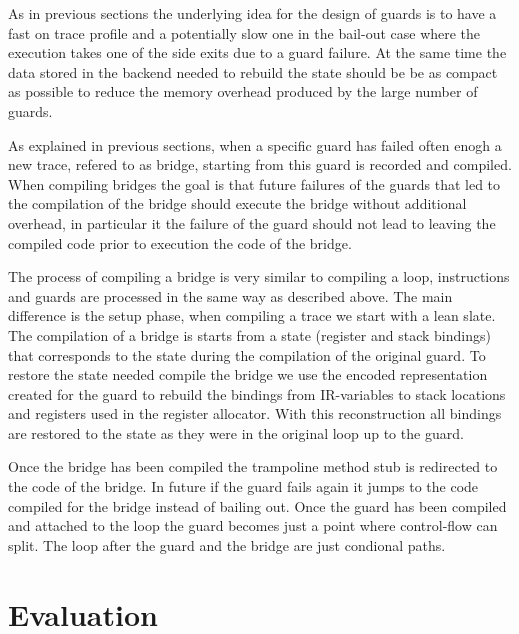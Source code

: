 \documentclass[10pt]{sigplanconf}
\newcommand\bivab[1]{\nb{DAVID}{#1}}
\begin{document}
As in previous sections the underlying idea for the design of guards is to have
a fast on trace profile and a potentially slow one in the bail-out case where
the execution takes one of the side exits due to a guard failure. At the same
time the data stored in the backend needed to rebuild the state should be be
as compact as possible to reduce the memory overhead produced by the large
number of guards\bivab{back this}.

As explained in previous sections, when a specific guard has failed often enogh
a new trace, refered to as bridge, starting from this guard is recorded and
compiled. When compiling bridges the goal is that future failures of the guards
that led to the compilation of the bridge should execute the bridge without
additional overhead, in particular it the failure of the guard should not lead
to leaving the compiled code prior to execution the code of the bridge.

The process of compiling a bridge is very similar to compiling a loop,
instructions and guards are processed in the same way as described above. The
main difference is the setup phase, when compiling a trace we start with a lean
slate. The compilation of a bridge is starts from a state (register and stack
bindings) that corresponds to the state during the compilation of the original
guard. To restore the state needed compile the bridge we use the encoded
representation created for the guard to rebuild the bindings from IR-variables
to stack locations and registers used in the register allocator.  With this
reconstruction all bindings are restored to the state as they were in the
original loop up to the guard.

Once the bridge has been compiled the trampoline method stub is redirected to
the code of the bridge. In future if the guard fails again it jumps to the code
compiled for the bridge instead of bailing out. Once the guard has been
compiled and attached to the loop the guard becomes just a point where
control-flow can split. The loop after the guard and the bridge are just
condional paths.

%



\section{Evaluation}
\label{sec:evaluation}
\end{document}
